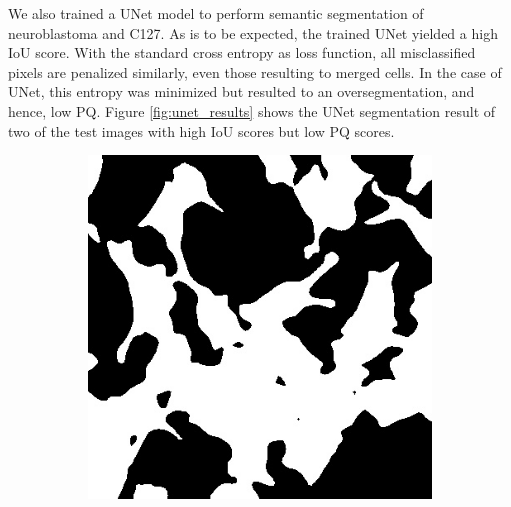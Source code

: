\documentclass[10pt, journal, compsoc]{IEEEtran}
\begin{document}
We also trained a UNet model to perform semantic segmentation of neuroblastoma and C127. As is to be expected, the trained UNet yielded a high IoU score. With the standard cross entropy as loss function, all misclassified pixels are penalized similarly, even those resulting to merged cells. In the case of UNet, this entropy was minimized but resulted to an oversegmentation, and hence, low PQ. Figure \ref{fig:unet_results} shows the UNet segmentation result of two of the test images with high IoU scores but low PQ scores.

\begin{figure}
\centering
\begin{subfigure}[b]{0.49\linewidth}
\includegraphics[width=\linewidth]{deeplab/110115.jpg}
\caption{}
\end{subfigure}
\begin{subfigure}[b]{0.49\linewidth}

\end{subfigure}
\end{figure}
\end{document}
